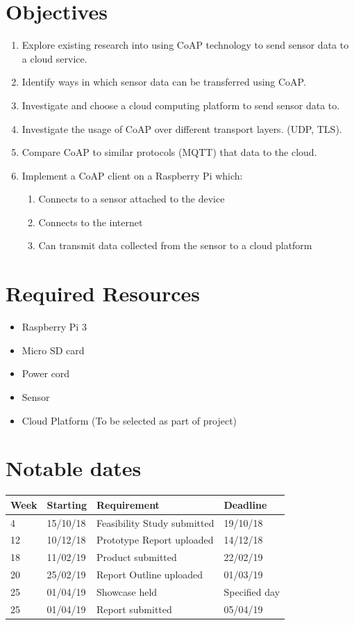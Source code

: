 \documentclass{article}
\begin{document}
	\section{Objectives}
	\begin{enumerate}
	\item Explore existing research into using CoAP technology to send sensor data to a cloud service.
	\item Identify ways in which sensor data can be transferred using CoAP.
	\item Investigate and choose a cloud computing platform to send sensor data to.
	\item Investigate the usage of CoAP over different transport layers. (UDP, TLS).
	\item Compare CoAP to similar protocols (MQTT) that data to the cloud.
	\item Implement a CoAP client on a Raspberry Pi which:
		\begin{enumerate}
			\item Connects to a sensor attached to the device
			\item Connects to the internet
			\item Can transmit data collected from the sensor to a cloud platform
		\end{enumerate}
	\end{enumerate}

	\section{Required Resources}
	\begin{itemize}
		\item Raspberry Pi 3
		\item Micro SD card
		\item Power cord
		\item Sensor
		\item Cloud Platform (To be selected as part of project)
	\end{itemize}
	
	\section{Notable dates}
	\begin{table}[h]
		\begin{tabular}{@{}llll@{}}
		\toprule
		Week & Starting & Requirement                 & Deadline      \\ \midrule
		4    & 15/10/18 & Feasibility Study submitted & 19/10/18      \\
		12   & 10/12/18 & Prototype Report uploaded   & 14/12/18      \\
		18   & 11/02/19 & Product submitted           & 22/02/19      \\
		20   & 25/02/19 & Report Outline uploaded     & 01/03/19      \\
		25   & 01/04/19 & Showcase held               & Specified day \\
		25   & 01/04/19 & Report submitted            & 05/04/19      \\ \bottomrule
		\end{tabular}
	\end{table}
\end{document}
